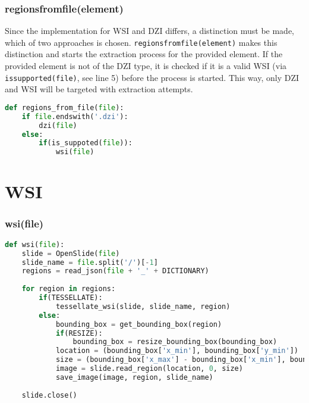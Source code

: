 \subsubsection{regions{\textunderscore}from{\textunderscore}file(element)}
Since the implementation for WSI and DZI differs, a distinction must be made, which of two approaches is chosen. \texttt{regions{\textunderscore}from{\textunderscore}file(element)} makes this distinction and starts the extraction process for the provided element. If the provided element is not of the DZI type, it is checked if it is a valid WSI (via \texttt{is{\textunderscore}supported(file)}, see line 5) before the process is started. This way, only DZI and WSI will be targeted with extraction attempts.
\begin{lstlisting}[frame=single,language=python]
def regions_from_file(file):
	if file.endswith('.dzi'):
		dzi(file)
	else:
		if(is_suppoted(file)):
			wsi(file)
\end{lstlisting}








\section{WSI}

\subsubsection{wsi(file)}

\begin{lstlisting}[frame=single,language=python]
def wsi(file):
	slide = OpenSlide(file)
	slide_name = file.split('/')[-1]
	regions = read_json(file + '_' + DICTIONARY)
	
	for region in regions:
		if(TESSELLATE):
			tessellate_wsi(slide, slide_name, region)
		else:
			bounding_box = get_bounding_box(region)
			if(RESIZE):
				bounding_box = resize_bounding_box(bounding_box)
			location = (bounding_box['x_min'], bounding_box['y_min'])
			size = (bounding_box['x_max'] - bounding_box['x_min'], bounding_box['y_max'] - bounding_box['y_min'])
			image = slide.read_region(location, 0, size)
			save_image(image, region, slide_name)
	
	slide.close()
\end{lstlisting}


